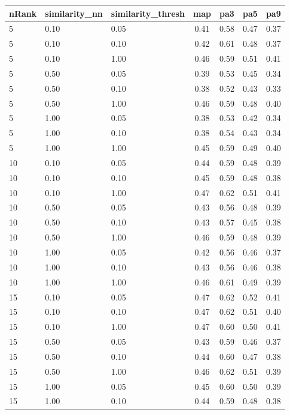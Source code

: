   
\begin{table} 
\begin{center} 
\scriptsize 
 \setlength{\tabcolsep}{.16667em} 
\begin{tabular}{lllcccc} 
nRank & similarity\_nn & similarity\_thresh & map & pa3 & pa5 & pa9 \\ 
\hline 
 5 & 0.10 & 0.05 & 0.41 & 0.58 & 0.47 & 0.37 \\ 
 5 & 0.10 & 0.10 & 0.42 & 0.61 & 0.48 & 0.37 \\ 
 5 & 0.10 & 1.00 & 0.46 & 0.59 & 0.51 & 0.41 \\ 
 5 & 0.50 & 0.05 & 0.39 & 0.53 & 0.45 & 0.34 \\ 
 5 & 0.50 & 0.10 & 0.38 & 0.52 & 0.43 & 0.33 \\ 
 5 & 0.50 & 1.00 & 0.46 & 0.59 & 0.48 & 0.40 \\ 
 5 & 1.00 & 0.05 & 0.38 & 0.53 & 0.42 & 0.34 \\ 
 5 & 1.00 & 0.10 & 0.38 & 0.54 & 0.43 & 0.34 \\ 
 5 & 1.00 & 1.00 & 0.45 & 0.59 & 0.49 & 0.40 \\ 
10 & 0.10 & 0.05 & 0.44 & 0.59 & 0.48 & 0.39 \\ 
10 & 0.10 & 0.10 & 0.45 & 0.59 & 0.48 & 0.38 \\ 
10 & 0.10 & 1.00 & 0.47 & 0.62 & 0.51 & 0.41 \\ 
10 & 0.50 & 0.05 & 0.43 & 0.56 & 0.48 & 0.39 \\ 
10 & 0.50 & 0.10 & 0.43 & 0.57 & 0.45 & 0.38 \\ 
10 & 0.50 & 1.00 & 0.46 & 0.59 & 0.48 & 0.39 \\ 
10 & 1.00 & 0.05 & 0.42 & 0.56 & 0.46 & 0.37 \\ 
10 & 1.00 & 0.10 & 0.43 & 0.56 & 0.46 & 0.38 \\ 
10 & 1.00 & 1.00 & 0.46 & 0.61 & 0.49 & 0.39 \\ 
15 & 0.10 & 0.05 & 0.47 & 0.62 & 0.52 & 0.41 \\ 
15 & 0.10 & 0.10 & 0.47 & 0.62 & 0.51 & 0.40 \\ 
15 & 0.10 & 1.00 & 0.47 & 0.60 & 0.50 & 0.41 \\ 
15 & 0.50 & 0.05 & 0.43 & 0.59 & 0.46 & 0.37 \\ 
15 & 0.50 & 0.10 & 0.44 & 0.60 & 0.47 & 0.38 \\ 
15 & 0.50 & 1.00 & 0.46 & 0.62 & 0.51 & 0.39 \\ 
15 & 1.00 & 0.05 & 0.45 & 0.60 & 0.50 & 0.39 \\ 
15 & 1.00 & 0.10 & 0.44 & 0.59 & 0.48 & 0.38 \\ 

\end{tabular}
\end{center}
\end{table}
